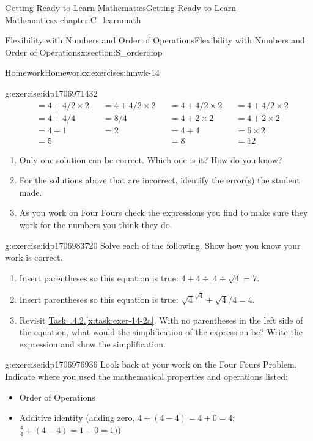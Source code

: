 \documentclass[oneside,10pt,]{book}
\newcommand{\xreffont}{\relax}
\numberwithin{equation}{chapter}
\newcommand{\amp}{&}
\begin{document}
\begin{chapterptx}{Getting Ready to Learn Mathematics}{}{Getting Ready to Learn Mathematics}{}{}{x:chapter:C_learnmath}
\begin{sectionptx}{Flexibility with Numbers and Order of Operations}{}{Flexibility with Numbers and Order of Operations}{}{}{x:section:S_orderofop}
\begin{exercises-subsection}{Homework}{}{Homework}{}{}{x:exercises:hmwk-14}
\begin{divisionexercise}{3}{}{}{g:exercise:idp1706971432}
\begin{align*}
\amp = 4 + 4 / 2 \times 2 \amp \amp = 4 + 4 / 2 \times 2 \amp \amp = 4 + 4 / 2 \times 2 \amp \amp = 4 + 4 / 2 \times 2\\
\amp = 4 + 4 / 4 \amp \amp = 8 / 4 \amp \amp = 4 + 2 \times 2 \amp \amp = 4 + 2 \times 2\\
\amp = 4 + 1 \amp \amp = 2 \amp \amp = 4 + 4 \amp \amp = 6 \times 2\\
\amp = 5 \amp \amp \amp \amp = 8 \amp \amp = 12
\end{align*}
%
\begin{enumerate}[font=\bfseries,label=(\alph*),ref=\alph*]
\item{}Only one solution can be correct. Which one is it? How do you know?%
\item{}For the solutions above that are incorrect, identify the error(s) the student made.%
\item{}As you work on \hyperref[x:worksheet:act-four-fours]{Four Fours} check the expressions you find to make sure they work for the numbers you think they do.%
\end{enumerate}
\end{divisionexercise}%
\begin{divisionexercise}{4}{}{}{g:exercise:idp1706983720}%
Solve each of the following. Show how you know your work is correct.%
\begin{enumerate}[font=\bfseries,label=(\alph*),ref=\alph*]
\item{}Insert parentheses so this equation is true: \(4 + 4 \div .4 \div \sqrt{4} = 7\).%
\item{}Insert parentheses so this equation is true: \(\sqrt{4}^{\sqrt{4}} + \sqrt{4} / 4 = 4\).%
\item{}Revisit \hyperref[x:task:exer-14-2a]{Task~{\xreffont 1.4.4.2}.{\xreffont\ref{x:task:exer-14-2a}}}. With no parentheses in the left side of the equation, what would the simplification of the expression be? Write the expression and show the simplification.%
\end{enumerate}
\end{divisionexercise}%
\begin{divisionexercise}{5}{}{}{g:exercise:idp1706976936}%
Look back at your work on the Four Fours Problem. Indicate where you used the mathematical properties and operations listed:%
\begin{itemize}[label=\textbullet]
\item{}Order of Operations%
\item{}Additive identity (adding zero, \(4 +(4 - 4) = 4 + 0 = 4\); \(\frac{4}{4}+(4-4)=1+0=1)\))%

\end{itemize}
\end{divisionexercise}
\end{exercises-subsection}
\end{sectionptx}
\end{chapterptx}
\end{document}
